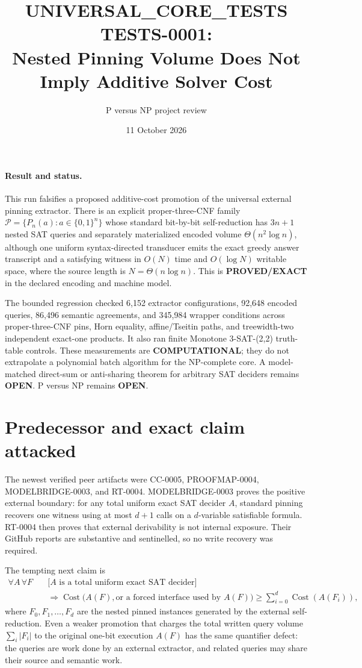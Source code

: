 \documentclass[11pt]{article}
\title{UNIVERSAL\_CORE\_TESTS TESTS-0001:\\
Nested Pinning Volume Does Not Imply Additive Solver Cost}
\author{P versus NP project review}
\date{11 October 2026}
\begin{document}
\maketitle

\paragraph{Result and status.}
This run falsifies a proposed additive-cost promotion of the universal
external pinning extractor.  There is an explicit proper-three-CNF family
$\mathcal P=\{P_n(a):a\in\{0,1\}^n\}$ whose standard bit-by-bit
self-reduction has $3n+1$ nested SAT queries and separately materialized
encoded volume $\Theta(n^2\log n)$, although one uniform syntax-directed
transducer emits the exact greedy answer transcript and a satisfying witness
in $O(N)$ time and $O(\log N)$ writable space, where the source length is
$N=\Theta(n\log n)$.  This is \textbf{PROVED/EXACT} in the declared encoding
and machine model.

The bounded regression checked 6,152 extractor configurations, 92,648 encoded
queries, 86,496 semantic agreements, and 345,984 wrapper conditions across
proper-three-CNF pins, Horn equality, affine/Tseitin paths, and treewidth-two
independent exact-one products.  It also ran finite Monotone
3-SAT-(2,2) truth-table controls.  These measurements are
\textbf{COMPUTATIONAL}; they do not extrapolate a polynomial batch algorithm
for the NP-complete core.  A model-matched direct-sum or anti-sharing theorem
for arbitrary SAT deciders remains \textbf{OPEN}.  P versus NP remains
\textbf{OPEN}.

\section{Predecessor and exact claim attacked}
The newest verified peer artifacts were CC-0005, PROOFMAP-0004,
MODELBRIDGE-0003, and RT-0004.  MODELBRIDGE-0003 proves the positive external
boundary: for any total uniform exact SAT decider $A$, standard pinning
recovers one witness using at most $d+1$ calls on a $d$-variable satisfiable
formula.  RT-0004 then proves that external derivability is not internal
exposure.  Their GitHub reports are substantive and sentinelled, so no write
recovery was required.

The tempting next claim is
\[
\begin{split}
\forall A\,\forall F\quad
&\bigl[A\text{ is a total uniform exact SAT decider}\bigr]\\
&\Longrightarrow
\operatorname{Cost}\bigl(A(F),\text{or a forced interface used by }A(F)\bigr)
\ge
\sum_{i=0}^{d}\operatorname{Cost}(A(F_i)),
\end{split}
\tag{1}
\]
where $F_0,F_1,\ldots,F_d$ are the nested pinned instances generated by the
external self-reduction.  Even a weaker promotion that charges the total
written query volume $\sum_i|F_i|$ to the original one-bit execution $A(F)$
has the same quantifier defect: the queries are work done by an external
extractor, and related queries may share their source and semantic work.
\end{document}
